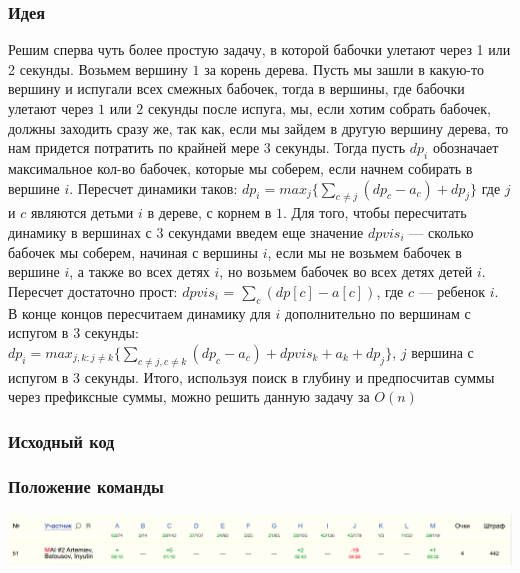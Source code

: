 \subsubsection*{Идея}
Решим сперва чуть более простую задачу, в которой бабочки улетают через 1 или 2 секунды. Возьмем вершину $1$ за корень дерева.
Пусть мы зашли в какую-то вершину и испугали всех смежных бабочек, тогда в вершины, где бабочки улетают через $1$ или $2$ секунды после испуга, мы, если хотим собрать бабочек, должны заходить сразу же, так как, если мы зайдем в другую вершину дерева, то нам придется потратить по крайней мере $3$ секунды.
Тогда пусть $dp_i$ обозначает максимальное кол-во бабочек, которые мы соберем, если начнем собирать в вершине $i$. Пересчет динамики таков: $dp_i = max_{j}\{\sum_{c \neq j}(dp_c - a_c) + dp_j\}$ где $j$ и $c$ являются детьми $i$ в дереве, с корнем в $1$.
Для того, чтобы пересчитать динамику в вершинах с $3$ секундами введем еще значение $dpvis_i$ --- сколько бабочек мы соберем, начиная с вершины $i$, если мы не возьмем бабочек в вершине $i$, а также во всех детях $i$, но возьмем бабочек во всех детях детей $i$. Пересчет достаточно прост: $dpvis_i$ = $\sum_{c}(dp[c] - a[c])$, где $c$ --- ребенок $i$. В конце концов пересчитаем динамику для $i$ дополнительно по вершинам с испугом в $3$ секунды: $dp_i = max_{j, k : j \neq k}\{\sum_{c \neq j, c \neq k}(dp_c - a_c) + dpvis_k + a_k + dp_j\}$, $j$ вершина с испугом в 3 секунды. Итого, используя поиск в глубину и предпосчитав суммы через префиксные суммы, можно решить данную задачу за $O(n)$
\subsubsection*{Исходный код}

\subsubsection*{Положение команды}
\includegraphics[scale=0.25]{images/gp_nanjing.png}\newline\noindent
\pagebreak


